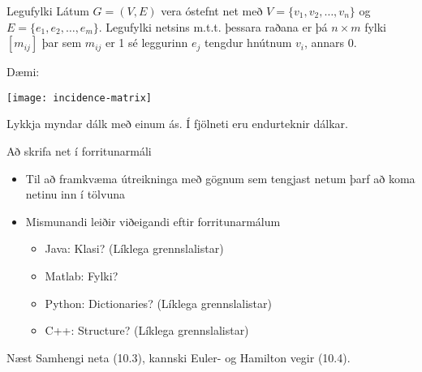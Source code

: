 \documentclass{beamer}
\begin{document}
\begin{frame}{Legufylki}
Látum $G = (V, E)$ vera óstefnt net með $V = \{v_1, v_2, \ldots, v_n\}$ og $E = \{e_1, e_2, \ldots, e_m\}$. Legufylki netsins m.t.t. þessara raðana er þá $n \times m$ fylki $[m_{ij}]$ þar sem $m_{ij}$ er 1 sé leggurinn $e_j$ tengdur hnútnum $v_i$, annars 0.

Dæmi:
\begin{center}
\texttt{[image: incidence-matrix]}
\end{center}
Lykkja myndar dálk með einum ás. Í fjölneti eru endurteknir dálkar.
\end{frame}


\begin{frame}{Að skrifa net í forritunarmáli}
\begin{itemize}
 \item Til að framkvæma útreikninga með gögnum sem tengjast netum þarf að koma netinu inn í tölvuna
 \item Mismunandi leiðir viðeigandi eftir forritunarmálum
 \begin{itemize}
  \item Java: Klasi? (Líklega grennslalistar)
  \item Matlab: Fylki? 
  \item Python: Dictionaries? (Líklega grennslalistar)
  \item C++: Structure? (Líklega grennslalistar)
 \end{itemize}
\end{itemize}
\end{frame}

\begin{frame}{Næst}
Samhengi neta (10.3), kannski Euler- og Hamilton vegir (10.4).
\end{frame}
\end{document}
